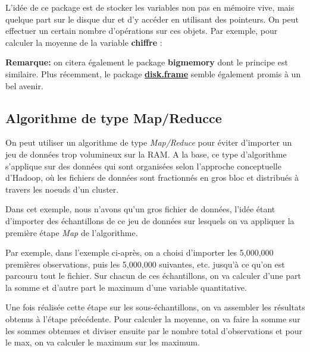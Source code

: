 \documentclass[
]{book}
\newenvironment{Shaded}{\begin{snugshade}}{\end{snugshade}}
\newcommand{\FunctionTok}[1]{\textcolor[rgb]{0.00,0.00,0.00}{#1}}
\newcommand{\NormalTok}[1]{#1}
\newcommand{\SpecialCharTok}[1]{\textcolor[rgb]{0.00,0.00,0.00}{#1}}
\newcommand{\StringTok}[1]{\textcolor[rgb]{0.31,0.60,0.02}{#1}}
\theoremstyle{definition}
\theoremstyle{definition}
\theoremstyle{definition}
\theoremstyle{definition}
\theoremstyle{remark}
\begin{document}
L'idée de ce package est de stocker les variables non pas en mémoire vive, mais quelque part sur le disque dur et d'y accéder en utilisant des pointeurs. On peut effectuer un certain nombre d'opérations sur ces objets. Par exemple, pour calculer la moyenne de la variable \textbf{chiffre} :

\begin{Shaded}
\end{Shaded}

\textbf{Remarque:} on citera également le package \textbf{bigmemory} dont le principe est similaire. Plus récemment, le package \href{https://cran.r-project.org/web/packages/disk.frame/readme/README.html}{\textbf{disk.frame}} semble également promis à un bel avenir.

\hypertarget{algorithme-de-type-mapreducce}{%
\subsection{Algorithme de type Map/Reducce}\label{algorithme-de-type-mapreducce}}

On peut utiliser un algorithme de type \emph{Map/Reduce} pour éviter d'importer un jeu de données trop volumineux sur la RAM. A la base, ce type d'algorithme s'applique sur des données qui sont organisées selon l'approche conceptuelle d'Hadoop, où les fichiers de données sont fractionnés en gros bloc et distribués à travers les noeuds d'un cluster.

Dans cet exemple, nous n'avons qu'un gros fichier de données, l'idée étant d'importer des échantillons de ce jeu de données sur lesquels on va appliquer la première étape \emph{Map} de l'algorithme.

Par exemple, dans l'exemple ci-après, on a choisi d'importer les 5,000,000 premières observations, puis les 5,000,000 suivantes, etc. jusqu'à ce qu'on est parcouru tout le fichier. Sur chacun de ces échantillons, on va calculer d'une part la somme et d'autre part le maximum d'une variable quantitative.

Une fois réalisée cette étape sur les sous-échantillons, on va assembler les résultats obtenus à l'étape précédente. Pour calculer la moyenne, on va faire la somme sur les sommes obtenues et diviser ensuite par le nombre total d'observations et pour le max, on va calculer le maximum sur les maximum.
\end{document}
